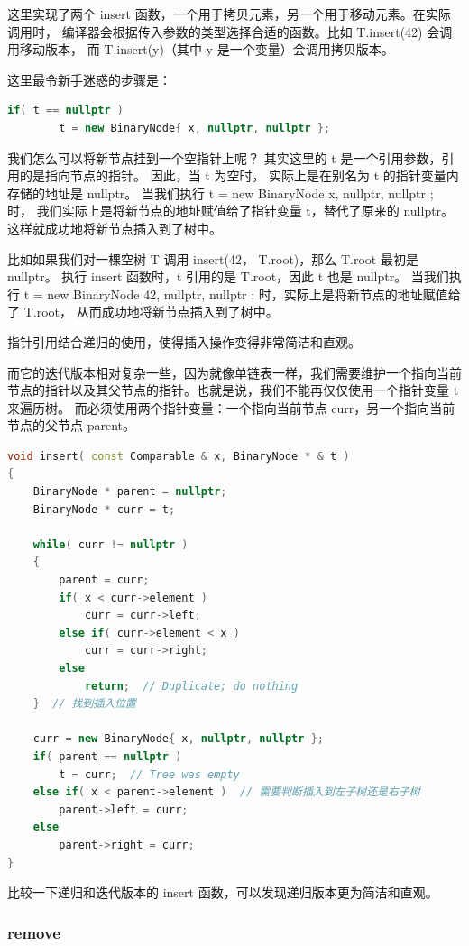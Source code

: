 \documentclass[a4paper]{ctexart}
\theoremstyle{definition}
\theoremstyle{definition}
\begin{document}
这里实现了两个 insert 函数，一个用于拷贝元素，另一个用于移动元素。在实际调用时，
编译器会根据传入参数的类型选择合适的函数。比如 T.insert(42) 会调用移动版本，
而 T.insert(y)（其中 y 是一个变量）会调用拷贝版本。

这里最令新手迷惑的步骤是：
\begin{lstlisting}[language=C++]
    if( t == nullptr )
        t = new BinaryNode{ x, nullptr, nullptr };
\end{lstlisting}
我们怎么可以将新节点挂到一个空指针上呢？ 其实这里的 t 是一个引用参数，引用的是指向节点的指针。 因此，当 t 为空时，
实际上是在别名为 t 的指针变量内存储的地址是 nullptr。 当我们执行 t = new BinaryNode{ x, nullptr, nullptr }; 时，
我们实际上是将新节点的地址赋值给了指针变量 t，替代了原来的 nullptr。 这样就成功地将新节点插入到了树中。

比如如果我们对一棵空树 T 调用 insert(42， T.root)，那么 T.root 最初是 nullptr。
执行 insert 函数时，t 引用的是 T.root，因此 t 也是 nullptr。
当我们执行 t = new BinaryNode{ 42, nullptr, nullptr }; 时，实际上是将新节点的地址赋值给了 T.root，
从而成功地将新节点插入到了树中。

指针引用结合递归的使用，使得插入操作变得非常简洁和直观。

而它的迭代版本相对复杂一些，因为就像单链表一样，我们需要维护一个指向当前节点的指针以及其父节点的指针。也就是说，我们不能再仅仅使用一个指针变量 t 来遍历树。
而必须使用两个指针变量：一个指向当前节点 curr，另一个指向当前节点的父节点 parent。

\begin{lstlisting}[language=C++]
void insert( const Comparable & x, BinaryNode * & t )
{
    BinaryNode * parent = nullptr;
    BinaryNode * curr = t;

    while( curr != nullptr )
    {
        parent = curr;
        if( x < curr->element )
            curr = curr->left;
        else if( curr->element < x )
            curr = curr->right;
        else
            return;  // Duplicate; do nothing
    }  // 找到插入位置

    curr = new BinaryNode{ x, nullptr, nullptr };
    if( parent == nullptr )
        t = curr;  // Tree was empty
    else if( x < parent->element )  // 需要判断插入到左子树还是右子树
        parent->left = curr;
    else
        parent->right = curr;
}
\end{lstlisting}

比较一下递归和迭代版本的 insert 函数，可以发现递归版本更为简洁和直观。

\subsubsection*{remove}
\end{document}

